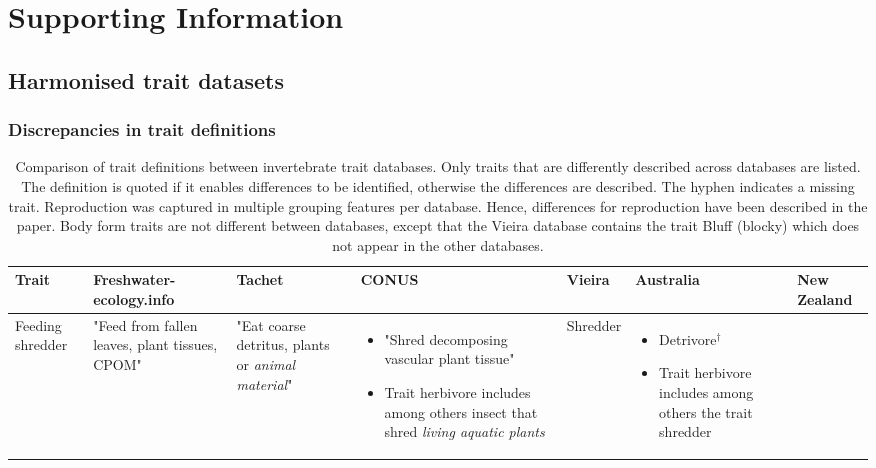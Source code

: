 \documentclass[../Draft_harmonization_paper.tex]{subfiles}
\begin{document}
\section*{Supporting Information}
\label{sec:SI}

\subsection*{Harmonised trait datasets}

\subsubsection*{Discrepancies in trait definitions}

\begin{landscape}
    \begin{longtable}{m{1.9cm}|m{3.3cm}|m{3.3cm}|m{2.7cm}|m{3cm}|m{3.2cm}|m{2.5cm}}
        \caption{Comparison of trait definitions between invertebrate trait databases. Only traits that are differently described across databases are listed. The definition is quoted if it enables differences to be identified, otherwise the differences are described. The hyphen indicates a missing trait. Reproduction was captured in multiple grouping features per database. Hence, differences for reproduction have been described in the paper. Body form traits are not different between databases, except that the Vieira database contains the trait Bluff (blocky) which does not appear in the other databases.}
        \label{stab:trait_definitions}
        \endfirsthead
        \toprule[.1em]
        Trait & \specialcell{Freshwater- \\ ecology.info} & Tachet & CONUS & Vieira & Australia & New Zealand \\
        \toprule[.1em]
        Feeding shredder & 
        "Feed from fallen leaves, plant tissues, CPOM" & 
        "Eat coarse detritus, plants or \textit{animal material}" & 
        \begin{itemize}
            \item "Shred decomposing vascular plant tissue"
            \item Trait herbivore includes among others insect that shred \textit{living aquatic plants} 
        \end{itemize} & 
        Shredder & 
        \begin{itemize}
            \item Detrivore$^{\dagger}$
            \item Trait herbivore includes among others the trait shredder

\end{itemize}
\end{longtable}
\end{landscape}
\end{document}
